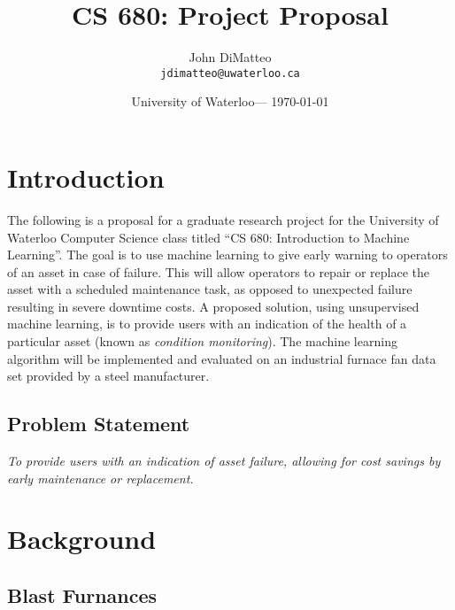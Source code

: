 \documentclass{article}
\title{CS 680: Project Proposal} %
\author{John DiMatteo\\ \texttt{jdimatteo@uwaterloo.ca}} %
\date{University of Waterloo--- \today} %
\begin{document}
\maketitle %



\newpage

\section*{Introduction} %

The following is a proposal for a graduate research project for the University of Waterloo Computer Science class titled ``CS 680: Introduction to Machine Learning''.
The goal is to use machine learning to give early warning to operators of an asset in case of failure.
This will allow operators to repair or replace the asset with a scheduled maintenance task, as opposed to unexpected failure resulting in severe downtime costs.
A proposed solution, using unsupervised machine learning, is to provide users with an indication of the health of a particular asset (known as \textit{condition monitoring}).
The machine learning algorithm will be implemented and evaluated on an industrial furnace fan data set provided by a steel manufacturer.

\subsection*{Problem Statement}
\begin{center}
	\textit{
To provide users with an indication of asset failure, allowing for cost savings by early maintenance or replacement.
	}
\end{center}

\section{Background} %


\subsection{Blast Furnances}
\end{document}
